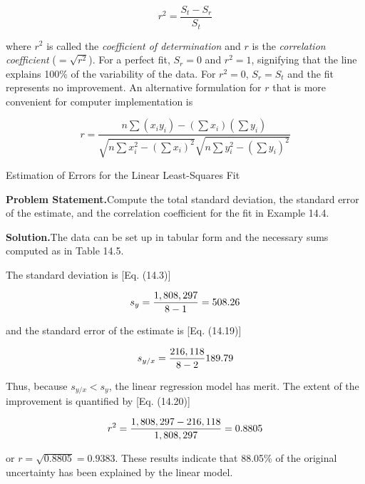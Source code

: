 \documentclass[../main.tex]{subfiles}
\begin{document}
\begin{equation}
	\tag{14.20}
	r^2 = \frac{S_t - S_r}{S_t}
\end{equation}

\noindent where $r^2$ is called the \textit{coefficient of determination} and $r$ is the \textit{correlation coefficient} ($=\sqrt{r^2}$). For a perfect fit, $S_r = 0$ and $r^2 = 1$, signifying that the line explains 100\% of the variability of the data. For $r^2 = 0$, $S_r = S_t$ and the fit represents no improvement. An alternative formulation for $r$ that is more convenient for computer implementation is

\begin{equation}
	\tag{14.21}
	r = \frac{n \sum (x_i y_i) - (\sum x_i) (\sum y_i)}{\sqrt{n \sum x^2_i - (\sum x_i)^2} \sqrt{n \sum y^2_i - (\sum y_i)^2}}
\end{equation}

\begin{example} Estimation of Errors for the Linear Least-Squares Fit

    \noindent\textbf{Problem Statement.}\quad Compute the total standard deviation, the standard error of the estimate, and the correlation coefficient for the fit in Example 14.4.

    \noindent\textbf{Solution.}\quad  The data can be set up in tabular form and the necessary sums computed as in Table 14.5.


    The standard deviation is [Eq. (14.3)]

	\begin{equation}
		\notag
		s_y = \frac{1,808,297}{8-1}=508.26
	\end{equation}

	\noindent and the standard error of the estimate is [Eq. (14.19)]

	\begin{equation}
		\notag
		s_{y/x} = \frac{216,118}{8-2}189.79
	\end{equation}

	\noindent Thus, because $s_{y/x} < s_y$, the linear regression model has merit. The extent of the improvement is quantified by [Eq. (14.20)]

	\begin{equation}
		\notag
		r^2 = \frac{1,808,297 - 216,118}{1,808,297} = 0.8805
	\end{equation}

	\noindent or $r = \sqrt{0.8805} = 0.9383$. These results indicate that 88.05\% of the original uncertainty has been explained by the linear model.
\end{example}
\end{document}

